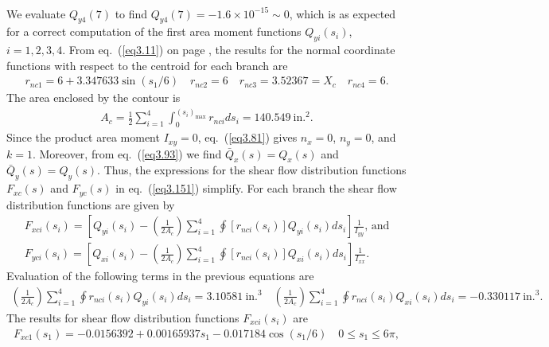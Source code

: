 \documentclass{AeroStructure-ERJohnson}
\begin{document}
\begin{example*}
\begin{gather}
\end{gather}
We evaluate $Q_{y 4}(7)$ to find $Q_{y 4}(7)=-1.6 \times 10^{-15} \sim 0$, which is as expected for a correct computation of the first area moment functions $Q_{y i}\left(s_{i}\right)$, $i=1,2,3,4$. From eq.~(\ref{eq3.11}) on page \pageref{eq3.11}, the results for the normal coordinate functions with respect to the centroid for each branch are
\begin{align}\label{ex3.4m}
r_{n c 1}=6+3.347633 \sin \left(s_{1} / 6\right) \quad r_{n c 2}=6 \quad r_{n c 3}=3.52367=X_{c} \quad r_{n c 4}=6.
\end{align}
The area enclosed by the contour is
\begin{align}\label{ex3.4n}
A_{c}=\frac{1}{2} \sum_{i=1}^{4} \int_{0}^{\left(s_{i}\right)_{\max }} r_{n c i} d s_{i}=140.549~\text{in.}^{2}.
\end{align}
Since the product area moment $I_{x y}=0$, eq.~(\ref{eq3.81}) gives $n_{x}=0$, $n_{y}=0$, and $k=1$. Moreover, from eq.~(\ref{eq3.93}) we find $\bar{Q}_{x}(s)=Q_{x}(s)$ and $\bar{Q}_{y}(s)=Q_{y}(s)$. Thus, the expressions for the shear flow distribution functions $F_{x c}(s)$ and $F_{y c}(s)$ in eq.~(\ref{eq3.151}) simplify. For each branch the shear flow distribution functions are given by
\begin{gather}\label{ex3.4o}
F_{x c i}\left(s_{i}\right)=\left[Q_{y i}\left(s_{i}\right)-\left(\frac{1}{2 A_{c}}\right) \sum_{i=1}^{4} \oint\left[r_{n c i}\left(s_{i}\right)\right] Q_{y i}\left(s_{i}\right) d s_{i}\right] \frac{1}{I_{y y}}\mbox{, and}\\[6pt]
F_{y c i}\left(s_{i}\right)=\left[Q_{x i}\left(s_{i}\right)-\left(\frac{1}{2 A_{c}}\right) \sum_{i=1}^{4} \oint\left[r_{n c i}\left(s_{i}\right)\right] Q_{x i}\left(s_{i}\right) d s_{i} \right]\frac{1}{I_{x x}}.\label{ex3.4p}
\end{gather}
Evaluation of the following\enlargethispage{-1\baselineskip} terms in the previous equations are
\begin{align}\label{ex3.4q}
\left(\frac{1}{2 A_{c}}\right)\sum_{i=1}^{4} \oint r_{n c i}\left(s_{i}\right) Q_{y i}\left(s_{i}\right) d s_{i}=3.10581~\text{in.}^{3} \quad\left(\frac{1}{2 A_{c}}\right) \sum_{i=1}^{4} \oint r_{n c i}\left(s_{i}\right) Q_{x i}\left(s_{i}\right) d s_{i}=-0.330117~\text{in.}^{3}.
\end{align}
The results for shear flow distribution functions $F_{x c i}\left(s_{i}\right)$ are
\begin{gather}\label{ex3.4r}
F_{x c 1}\left(s_{1}\right)=-0.0156392+0.00165937 s_{1}-0.017184 \cos \left(s_{1} / 6\right) \quad 0 \leq s_{1} \leq 6 \pi,\\[4pt]

\end{gather}
\end{example*}
\end{document}
